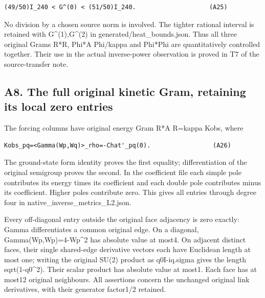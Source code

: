 \documentclass[11pt,a4paper]{article}
\renewcommand{\[}{\begingroup\small\originaldisplaystart}
\renewcommand{\]}{\originaldisplayend\endgroup}
\begin{document}
\begin{verbatim}
(49/50)I_240 < G^(0) < (51/50)I_240.                    (A25)
\end{verbatim}

No division by a chosen source norm is involved. The tighter rational
interval is retained with G\^{}(1),G\^{}(2) in
{g\allowbreak{}e\allowbreak{}n\allowbreak{}e\allowbreak{}r\allowbreak{}a\allowbreak{}t\allowbreak{}e\allowbreak{}d\allowbreak{}/\allowbreak{}h\allowbreak{}e\allowbreak{}a\allowbreak{}t\allowbreak{}\_\allowbreak{}b\allowbreak{}o\allowbreak{}u\allowbreak{}n\allowbreak{}d\allowbreak{}s\allowbreak{}.\allowbreak{}j\allowbreak{}s\allowbreak{}o\allowbreak{}n\allowbreak{}.\allowbreak{}}
Thus all three original Grams R*R, Phi*A Phi/kappa and Phi*Phi are
quantitatively controlled together. Their use in the actual
inverse-power observation is proved in T7 of the source-transfer note.

\subsection{A8. The full original kinetic Gram, retaining its local zero
entries}\label{a8.-the-full-original-kinetic-gram-retaining-its-local-zero-entries}

The forcing columns have original energy Gram R*A R=kappa Kobs, where

\begin{verbatim}
Kobs_pq=<Gamma(Wp,Wq)>_rho=-Chat'_pq(0).                 (A26)
\end{verbatim}

The ground-state form identity proves the first equality;
differentiation of the original semigroup proves the second. In the
coefficient file each simple pole contributes its energy times its
coefficient and each double pole contributes minus its coefficient.
Higher poles contribute zero. This gives all entries through degree four
in
{n\allowbreak{}a\allowbreak{}t\allowbreak{}i\allowbreak{}v\allowbreak{}e\allowbreak{}\_\allowbreak{}i\allowbreak{}n\allowbreak{}v\allowbreak{}e\allowbreak{}r\allowbreak{}s\allowbreak{}e\allowbreak{}\_\allowbreak{}m\allowbreak{}e\allowbreak{}t\allowbreak{}r\allowbreak{}i\allowbreak{}c\allowbreak{}s\allowbreak{}\_\allowbreak{}L\allowbreak{}2\allowbreak{}.\allowbreak{}j\allowbreak{}s\allowbreak{}o\allowbreak{}n\allowbreak{}.\allowbreak{}}

Every off-diagonal entry outside the original face adjacency is zero
exactly: Gamma differentiates a common original edge. On a diagonal,
Gamma(Wp,Wp)=4-Wp\^{}2 has absolute value at most4. On adjacent distinct
faces, their single shared-edge derivative vectors each have Euclidean
length at most one; writing the original SU(2) product as q0I-iq.sigma
gives the length sqrt(1-q0\^{}2). Their scalar product has absolute
value at most1. Each face has at most12 original neighbours. All
assertions concern the unchanged original link derivatives, with their
generator factor1/2 retained.
\end{document}
